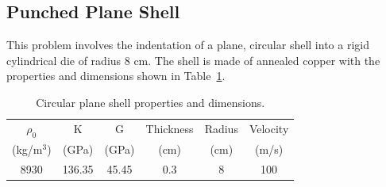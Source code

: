   \subsection{Punched Plane Shell}
    This problem involves the indentation of a plane, circular shell into
    a rigid cylindrical die of radius 8 cm.  The shell is made of annealed 
    copper with the properties and dimensions shown in 
    Table~\ref{tab:planeShell}.
    \begin{table}[h]
      \caption{Circular plane shell properties and dimensions.}
      \label{tab:planeShell}
      \begin{center}
      \begin{tabular}{cccccc}
         \hline
         $\rho_0$ & K      & G     & Thickness & Radius & Velocity \\
       (kg/m$^3$) & (GPa)  & (GPa) & (cm)      & (cm)   & (m/s) \\
         \hline
         8930     & 136.35 & 45.45 & 0.3       & 8      & 100 \\
         \hline
      \end{tabular}
      \end{center}
    \end{table}

